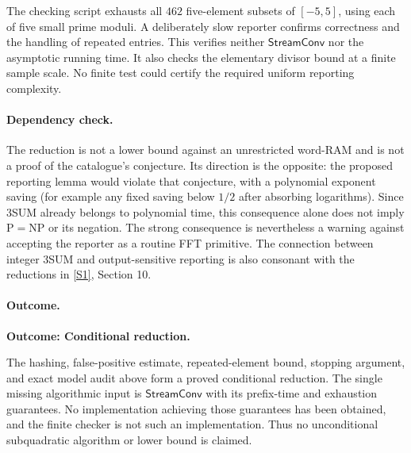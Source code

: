 \documentclass[11pt,a4paper]{article}
\newcommand{\sref}[2]{\hyperlink{source:#1:#2}{[S#2]}}
\numberwithin{equation}{section}
\begin{document}
The checking script exhausts all $462$ five-element subsets of
$[-5,5]$, using each of five small prime moduli. A deliberately slow
reporter confirms correctness and the handling of repeated entries.
This verifies neither $\mathsf{StreamConv}$ nor the asymptotic running
time. It also checks the elementary divisor bound at a finite sample
scale. No finite test could certify the required uniform reporting
complexity.

\paragraph{Dependency check.}
The reduction is not a lower bound against an unrestricted word-RAM and
is not a proof of the catalogue's conjecture. Its direction is the
opposite: the proposed reporting lemma would violate that conjecture,
with a polynomial exponent saving (for example any fixed saving below
$1/2$ after absorbing logarithms). Since 3SUM already belongs to
polynomial time, this consequence alone does not imply
$\mathrm P=\mathrm{NP}$ or its negation. The strong consequence is
nevertheless a warning against accepting the reporter as a routine FFT
primitive. The connection between integer 3SUM and output-sensitive
reporting is also consonant with the reductions in
\sref{statement}{1}, Section 10.

\paragraph{Outcome.}
\textbf{Outcome: Conditional reduction.}

The hashing, false-positive estimate, repeated-element bound, stopping
argument, and exact model audit above form a proved conditional reduction.
The single missing algorithmic input is $\mathsf{StreamConv}$ with its
prefix-time and exhaustion guarantees. No implementation achieving those
guarantees has been obtained, and the finite checker is not such an
implementation. Thus no unconditional subquadratic algorithm or lower
bound is claimed.
\end{document}
